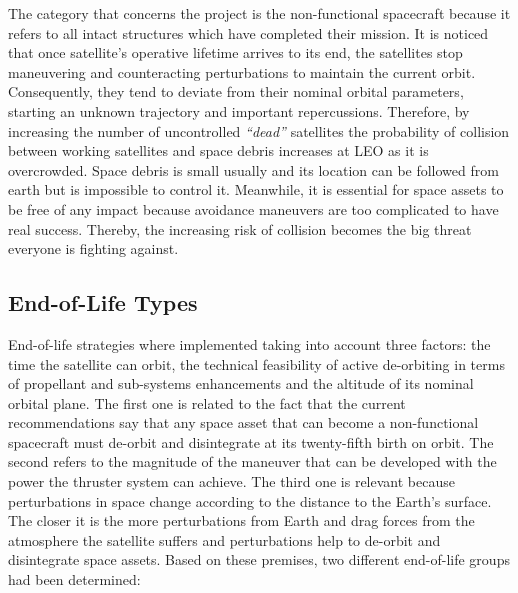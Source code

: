 \newline
\newline
 The category that concerns the project is the non-functional spacecraft because it refers to all intact structures which have completed their mission. It is noticed that once satellite’s operative lifetime arrives to its end, the satellites stop maneuvering and counteracting perturbations to maintain the current orbit. Consequently, they tend to deviate from their nominal orbital parameters, starting an unknown trajectory and important repercussions. 
\newline
\newline
Therefore, by increasing the number of uncontrolled \textit{``dead''} satellites the probability of collision between working satellites and space debris increases at LEO as it is overcrowded. Space debris is small usually and its location can be followed from earth but is impossible to control it. Meanwhile, it is essential for space assets to be free of any impact because avoidance maneuvers are too complicated to have real success.  Thereby, the increasing risk of collision becomes the big threat everyone is fighting against. 


\subsection{End-of-Life Types}

End-of-life strategies where implemented taking into account three factors: the time the satellite can orbit, the technical feasibility of active de-orbiting in terms of propellant and sub-systems enhancements and the altitude of its nominal orbital plane. 
\newline
\newline
The first one is related to the fact that the current recommendations say that any space asset that can become a non-functional spacecraft must de-orbit and disintegrate at its twenty-fifth birth on orbit. The second refers to the magnitude of the maneuver that can be developed with the power the thruster system can achieve. The third one is relevant because perturbations in space change according to the distance to the Earth’s surface. The closer it is the more perturbations from Earth and drag forces from the atmosphere the satellite suffers and perturbations help to de-orbit and disintegrate space assets.
\newline
\newline
Based on these premises, two different end-of-life groups had been determined: 

